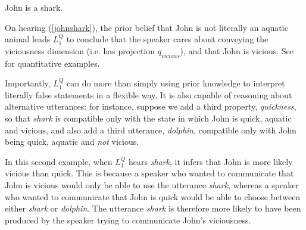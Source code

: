 \documentclass[9pt,twocolumn,twoside,lineno]{pnas-new}
\newcommand{\Listener}{L}
\newcommand{\QLONE}{\Listener_{{1}}^{{Q}}}
\begin{document}
	\begin{examples}
	\item John is a shark. \label{johnshark}
	\end{examples}

	




		
	
	On hearing (\ref{johnshark}), the prior belief that John is not literally an aquatic animal leads $\QLONE$ to conclude that the speaker cares about conveying the viciousness dimension (i.e. has projection $q_{vicious}$), and that John is vicious. See \cite{kao} for quantitative examples.

	Importantly, $\QLONE$ can do more than simply using prior knowledge to interpret literally false statements in a flexible way. It is also capable of reasoning about alternative utterances: for instance, suppose we add a third property, \emph{quickness}, so that \emph{shark} is compatible only with the state in which John is quick, aquatic and vicious, and also add a third utterance, \emph{dolphin}, compatible only with John being quick, aquatic and \emph{not} vicious.

	
	In this second example, when $\QLONE$ hears \emph{shark}, it infers that John is more likely vicious than quick. This is because a speaker who wanted to communicate that John is vicious would only be able to use the utterance \emph{shark}, whereas a speaker who wanted to communicate that John is quick would be able to choose between either \emph{shark} or \emph{dolphin}. The utterance \emph{shark} is therefore more likely to have been produced by the speaker trying to communicate John's viciousness.
\end{document}
